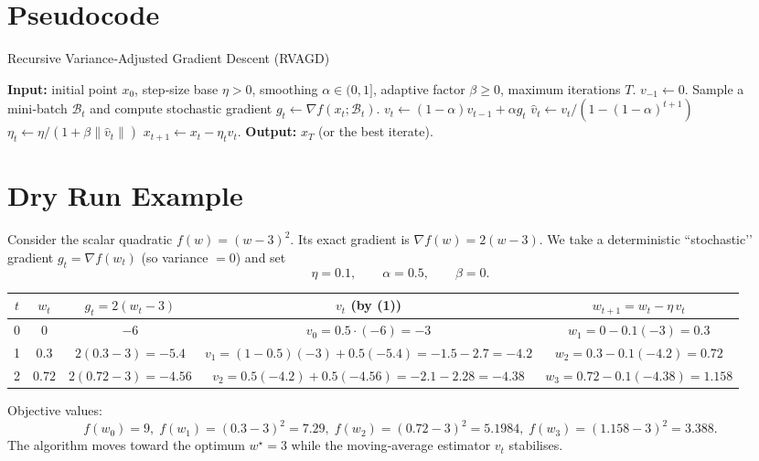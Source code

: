 \documentclass[11pt]{article}
\newcommand{\norm}[1]{\left\lVert#1\right\rVert}
\newcommand{\grad}{\nabla}
\begin{document}
\section*{Pseudocode}
\begin{algorithm}[H]
\caption{Recursive Variance‑Adjusted Gradient Descent (RVAGD)}
\begin{algorithmic}[1]
\State \textbf{Input:} initial point $x_0$, step‑size base $\eta>0$, 
smoothing $\alpha\in(0,1]$, adaptive factor $\beta\ge0$, 
maximum iterations $T$.
\State $v_{-1}\gets 0$.
    \State Sample a mini‑batch $\mathcal{B}_t$ and compute stochastic gradient 
    $g_t\gets \grad f(x_t;\mathcal{B}_t)$.
    \State $v_t \gets (1-\alpha)v_{t-1}+\alpha g_t$ \hfill{}
    \State $\hat v_t \gets v_t/(1-(1-\alpha)^{t+1})$ \hfill{}
    \State $\eta_t \gets \eta/(1+\beta\norm{\hat v_t})$ \hfill{}
    \State $x_{t+1} \gets x_t-\eta_t\hat v_t$.
\EndFor
\State \textbf{Output:} $x_T$ (or the best iterate).
\end{algorithmic}
\end{algorithm}

\section*{Dry Run Example}
Consider the scalar quadratic $f(w)=(w-3)^2$.  
Its exact gradient is $\grad f(w)=2(w-3)$.  
We take a deterministic “stochastic’’ gradient $g_t=\grad f(w_t)$ (so variance $=0$) and set
\[
\eta=0.1,\qquad \alpha=0.5,\qquad \beta=0.
\]

\begin{center}
\begin{tabular}{c|c|c|c|c}
$t$ & $w_t$ & $g_t=2(w_t-3)$ & $v_t$ (by (1)) & $w_{t+1}=w_t-\eta \,v_t$\\\hline
0 & $0$ & $-6$ & $v_0=0.5\cdot(-6)=-3$ & $w_1=0-0.1(-3)=0.3$\\
1 & $0.3$ & $2(0.3-3)=-5.4$ & $v_1=(1-0.5)(-3)+0.5(-5.4)=-1.5-2.7=-4.2$ & $w_2=0.3-0.1(-4.2)=0.72$\\
2 & $0.72$ & $2(0.72-3)=-4.56$ & $v_2=0.5(-4.2)+0.5(-4.56)=-2.1-2.28=-4.38$ & $w_3=0.72-0.1(-4.38)=1.158$\\
\end{tabular}
\end{center}
Objective values:
\[
f(w_0)=9,\; f(w_1)=(0.3-3)^2=7.29,\; f(w_2)=(0.72-3)^2=5.1984,\; f(w_3)=(1.158-3)^2=3.388.
\]
The algorithm moves toward the optimum $w^\star=3$ while the moving‑average estimator $v_t$ stabilises.
\end{document}
